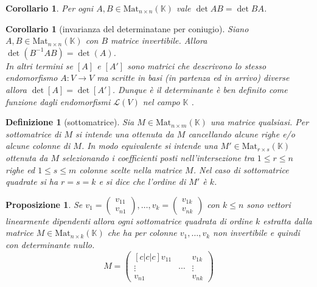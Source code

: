 \documentclass[9pt, a4paper]{article}
\newcommand{\K}{\mathbb{K}}
\theoremstyle{mythm}
\newtheorem{definition}{Definizione}[section]
\newtheorem{corollary}[thm]{Corollario}
\newtheorem{prop}[thm]{Proposizione}
\begin{document}
\begin{corollary}
	Per ogni $ A, B \in \mathrm{Mat}_{n \times n} (\K) $ vale $ \det{AB} = \det{BA} $.
\end{corollary}

\begin{corollary}[invarianza del determinatane per coniugio]
	Siano $ A, B \in \mathrm{Mat}_{n \times n} (\K) $ con $ B $ matrice invertibile. Allora $ \det{(B^{-1} A B)} = \det{(A)} $. \\
	In altri termini se $ [A] $ e $ [A'] $ sono matrici che descrivono lo stesso endomorfismo $ A \colon V \to V $ ma scritte in basi (in partenza ed in arrivo) diverse allora $ \det{[A]} = \det{[A']} $. Dunque è il determinante è ben definito come funzione dagli endomorfismi $ \mathscr{L}(V) $ nel campo $ \K $ . 
\end{corollary}

\begin{definition}[sottomatrice]
	Sia $ M \in \mathrm{Mat}_{n \times m} (\K) $ una matrice qualsiasi. Per sottomatrice di $ M $ si intende una ottenuta da $ M $ cancellando alcune righe e/o alcune colonne di $ M $. In modo equivalente si intende una $ M' \in \mathrm{Mat}_{r \times s} (\K) $ ottenuta da $ M $ selezionando i coefficienti posti nell'intersezione tra $ 1 \leq r \leq n $ righe ed $ 1 \leq s \leq m $ colonne scelte nella matrice $ M $. Nel caso di sottomatrice quadrate si ha $ r = s = k $ e si dice che l'ordine di $ M' $ è $ k $. 
\end{definition}

\begin{prop}
	Se $ v_1 = \begin{pmatrix} v_{11} \\ v_{n1} \end{pmatrix}, \ldots, v_k = \begin{pmatrix} v_{1k} \\ v_{nk} \end{pmatrix} $ con $ k \leq n $ sono vettori linearmente \emph{dipendenti} allora ogni sottomatrice quadrata di ordine $ k $ estratta dalla matrice $ M \in \mathrm{Mat}_{n \times k} (\K) $ che ha per colonne $ v_1, \ldots, v_k $ non invertibile e quindi con determinante nullo. 
	\[M = \begin{pmatrix}[c|c|c]
	v_{11} & & v_{1k} \\
	\vdots & \cdots & \vdots \\
	v_{n1} & & v_{nk}
	\end{pmatrix}\]
\end{prop}
\end{document}

